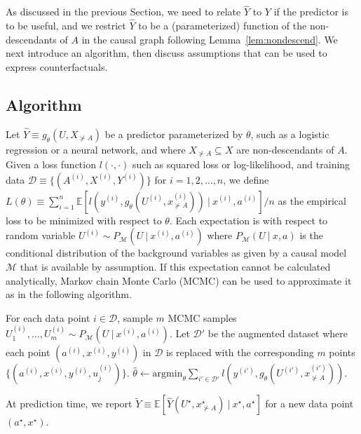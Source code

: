 
As discussed in the previous Section, we need to relate $\hat Y$ to
$Y$ if the predictor is to be useful, and  we restrict
$\hat Y$ to be a (parameterized) function of the non-descendants of
$A$ in the causal graph following
Lemma~\ref{lem:nondescend}. We next introduce an algorithm, then
discuss assumptions that
can be used to express counterfactuals.

\subsection{Algorithm}
\label{sec:algorithm}

Let $\hat Y \equiv g_\theta(U, X_{\nsucc A})$ be a predictor
parameterized by $\theta$, such as a logistic regression or a neural
network, and where $X_{\nsucc A} \subseteq X$ are non-descendants of
$A$. Given a loss function $l(\cdot, \cdot)$ such as squared loss or
log-likelihood, and training data $\mathcal D \equiv \{(A^{(i)}, X^{(i)}, Y^{(i)})\}$
for $i = 1, 2, \dots, n$, we define $L(\theta) \equiv \sum_{i =
  1}^n \mathbb E[l(y^{(i)}, g_\theta(U^{(i)}, x^{(i)}_{\nsucc
    A}))\ |\ x^{(i)}, a^{(i)}] / n$ as the empirical loss to be
minimized with respect to $\theta$.  Each expectation is with respect
to random variable $U^{(i)} \sim P_{\mathcal M}(U\ |\ x^{(i)},
a^{(i)})$ where $P_{\mathcal M}(U\ |\ x, a)$ is the conditional
distribution of the background variables as given by a causal model
$\mathcal M$ that is available by assumption. If this expectation
cannot be calculated analytically, Markov chain Monte Carlo (MCMC) can
be used to approximate it as in the following algorithm.
  
\begin{algorithmic}[1]
  \State For each data point $i \in \mathcal D$, sample $m$ MCMC samples
  $U_1^{(i)}, \dots, U_m^{(i)} \sim P_{\mathcal M}(U\ |\ x^{(i)},a^{(i)})$.
  \State Let $\mathcal D'$ be the augmented dataset where each point
  $(a^{(i)}, x^{(i)}, y^{(i)})$ in $\mathcal D$ is replaced with the corresponding $m$ points
  $\{(a^{(i)}, x^{(i)}, y^{(i)}, u_j^{(i)})\}$.
  \State $\hat \theta \leftarrow \mathrm{argmin}_\theta \sum_{i' \in \mathcal D'}
                                   l(y^{(i')}, g_\theta(U^{(i')}, x^{(i')}_{\nsucc A}))$.
\EndProcedure
\end{algorithmic}

At prediction time, we report $\tilde Y \equiv \mathbb E[\hat Y(U^\star,
  x^\star_{\nsucc A})\ |\ x^\star, a^\star]$ for a new data point $(a^\star,
x^\star)$.

